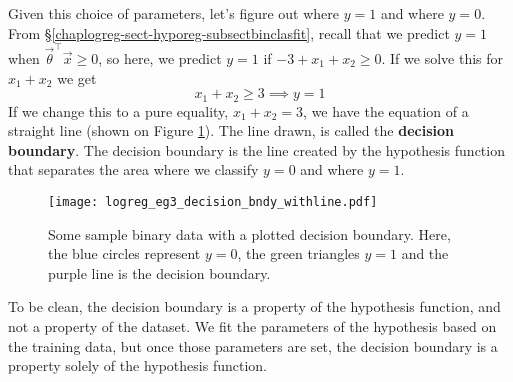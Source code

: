 Given this choice of parameters, let's figure out where $y=1$ and where $y=0$. From \S\ref{chaplogreg-sect-hyporeg-subsectbinclasfit}, recall that we predict $y=1$ when $\vec{\theta}^\intercal\vec{x} \geq 0$, so here, we predict $y=1$ if $-3 + x_1 + x_2 \geq 0$. If we solve this for $x_1 + x_2$ we get
$$
x_1 + x_2 \geq 3 \implies y = 1
$$
If we change this to a pure equality, $x_1 + x_2 = 3$, we have the equation of a straight line (shown on Figure \ref{logreg_eg3_decision_bndy_withline.pdf}). The line drawn, is called the \textbf{decision boundary}. The decision boundary is the line created by the hypothesis function that separates the area where we classify $y=0$ and where $y=1$.

\begin{figure}[h] %
	\centering
	\graphicspath{{./Figures/}} %
	\texttt{[image: logreg\_eg3\_decision\_bndy\_withline.pdf]} 
	\caption[]{Some sample binary data with a plotted decision boundary. Here, the blue circles represent $y=0$, the green triangles $y=1$ and the purple line is the decision boundary.}
	\label{logreg_eg3_decision_bndy_withline.pdf}
\end{figure}

To be clean, the decision boundary is a property of the hypothesis function, and not a property of the dataset. We fit the parameters of the hypothesis based on the training data, but once those parameters are set, the decision boundary is a property solely of the hypothesis function. 

